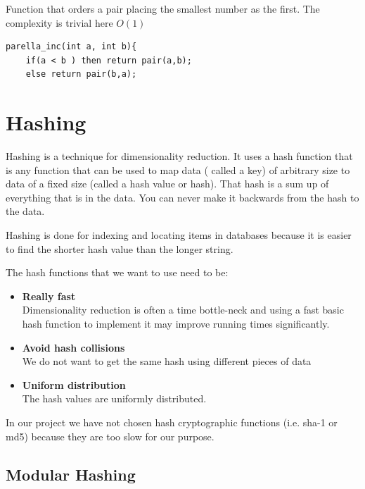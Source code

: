 \documentclass[12pt]{article}
\begin{document}
\begin{large}
Function that orders a pair placing the smallest number as the first. The complexity is trivial here $O(1)$
\end{large}

\begin{lstlisting}
parella_inc(int a, int b){
	if(a < b ) then return pair(a,b);
	else return pair(b,a);
 \end{lstlisting}
 
\section{Hashing}

Hashing is a technique for dimensionality reduction. It uses a hash function that is any function that can be used to map data ( called a key) of arbitrary size to data of a fixed size (called a hash value or hash). That hash is a sum up of everything that is in the data. You can never make it backwards from the hash to the data.

Hashing is done for indexing and locating items in databases because it is easier to find the shorter hash value than the longer string.

The hash functions that we want to use need to be: 

\begin{itemize}
\item \textbf{Really fast}\\
Dimensionality reduction is often a time bottle-neck and using a fast basic hash function to implement it may improve running times significantly. 
\item \textbf{Avoid hash collisions}\\
We do not want to get the same hash using different pieces of data %
\item \textbf{Uniform distribution}\\
The hash values are uniformly distributed.

\end{itemize}

In our project we have not chosen hash cryptographic functions (i.e. sha-1 or md5) because they are too slow for our purpose.

\subsection{Modular Hashing}
\end{document}
